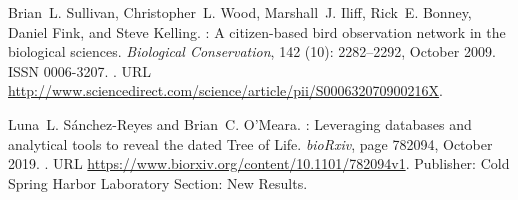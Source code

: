 \documentclass[oupdraft]{sysbio_sse}
\begin{document}
\begin{thebibliography}{18}
Brian~L. Sullivan, Christopher~L. Wood, Marshall~J. Iliff, Rick~E. Bonney,
  Daniel Fink, and Steve Kelling.
: {A} citizen-based bird observation network in the biological
  sciences.
\newblock \emph{Biological Conservation}, 142 (10):
  2282--2292, October 2009.
\newblock ISSN 0006-3207.
\newblock {}.
\newblock URL
  \url{http://www.sciencedirect.com/science/article/pii/S000632070900216X}.

Luna~L. Sánchez-Reyes and Brian~C. O’Meara.
: {Leveraging} databases and analytical tools to reveal the
  dated {Tree} of {Life}.
\newblock \emph{bioRxiv}, page 782094, October 2019.
\newblock {}.
\newblock URL \url{https://www.biorxiv.org/content/10.1101/782094v1}.
\newblock Publisher: Cold Spring Harbor Laboratory Section: New Results.

\end{thebibliography}





\end{document}
